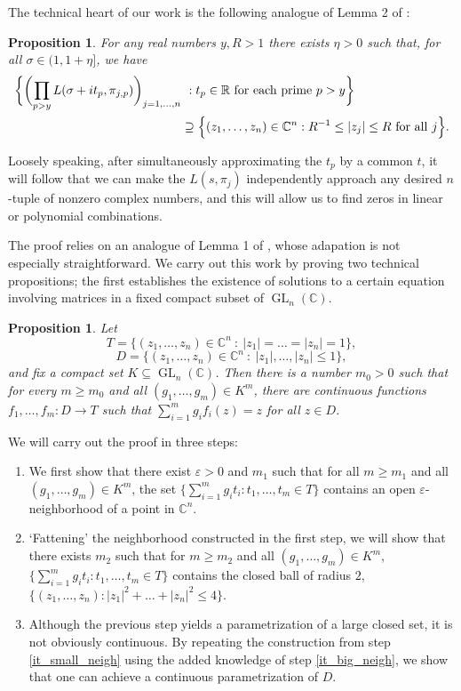 \documentclass[11pt]{amsart}
\newtheorem{proposition}[theorem]{Proposition}
\theoremstyle{remark}
\numberwithin{theorem}{section}
\numberwithin{equation}{section}
\newcommand{\R}{\mathbb{R}}
\newcommand{\C}{\mathbb{C}}
\DeclareMathOperator{\GL}{GL}
\begin{document}
The technical heart of our work is the following analogue of Lemma 2 of \cite{SW}:

\begin{proposition}\label{prop:lem2}
For any real numbers $y,R>1$ there exists $\eta>0$ such that,
for all $\sigma\in(1,1+\eta]$, we have
\begin{align*}
\bigg\{\biggl(\prod_{p > y}
L(\sigma+it_p,\pi_{j,p})\biggr)_{j=1,\ldots,n}&\ :
t_p\in\R\text{ for each prime }p>y\bigg\}\\
&\supseteq
\Big\{ (z_1, \ldots, z_n) \in \C^n :
R^{-1} \leq |z_j| \leq R \textnormal{ for all } j \Big\}.
\end{align*}
\end{proposition}
Loosely speaking, after simultaneously approximating the $t_p$ by a common
$t$, it will follow that we can make the $L(s, \pi_j)$ independently
approach any desired $n$-tuple of nonzero complex numbers, and this will
allow us to find zeros in linear or polynomial combinations.

The proof relies on an analogue of Lemma 1 of \cite{SW}, whose adapation
is not especially straightforward. We carry out this work by proving
two technical propositions; the first establishes the existence of
solutions to a certain equation involving matrices in a fixed compact
subset of $\GL_n(\C)$.

\begin{proposition}\label{prop:td}
Let
\[
T = \{ (z_1, \ldots, z_n) \in \C^n \ : \ |z_1| = \ldots = |z_n| = 1 \},
\]
\[
D = \{ (z_1, \ldots, z_n) \in \C^n \ : \ |z_1|, \ldots, |z_n| \leq 1 \},
\]
and fix a compact set $K \subseteq \GL_n(\C)$.
Then there is a number $m_0 > 0$ such that for every $m \geq m_0$ and all
$(g_1, \ldots, g_m) \in K^m$, there are continuous functions
$f_1, \ldots, f_m : D \rightarrow T$ such that
$\sum_{i = 1}^m g_i f_i(z) = z$ for all $z \in D$.
\end{proposition}

We will carry out the proof in three steps:
\begin{enumerate}[(1)]
\item\label{it_small_neigh}
We first show that there exist $\varepsilon > 0$ and
$m_1$ such that
for all $m \geq m_1$ and all $(g_1, \ldots, g_m) \in K^m$, the set
$\{ \sum_{i = 1}^m g_i t_i : t_1,\ldots,t_m \in T \}$
contains an open $\varepsilon$-neighborhood of a point in $\C^n$.
\item\label{it_big_neigh}
`Fattening' the neighborhood constructed in the first step, we will 
show that there exists $m_2$ such that for $m \geq m_2$ and all
$(g_1,\ldots,g_m)\in K^m$,
$\{ \sum_{i = 1}^m g_i t_i : t_1,\ldots,t_m \in T \}$
contains the closed ball of radius $2$,
$\{(z_1,\ldots,z_n):|z_1|^2+\ldots+|z_n|^2\le4\}$.
\item\label{it_cont}
Although the previous step yields a parametrization of a large closed
set, it is not
obviously continuous. By repeating the construction from step
\eqref{it_small_neigh} using the added knowledge of step \eqref{it_big_neigh},
we show that one can achieve a continuous parametrization of $D$.
\end{enumerate}
\end{document}
